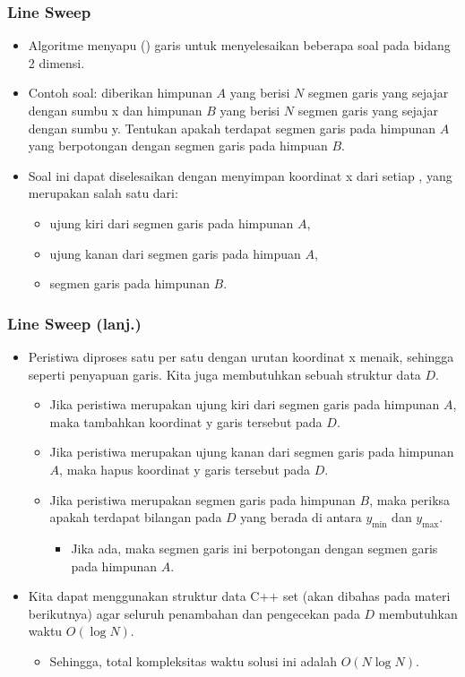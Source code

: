 \begin{frame}[fragile]
\frametitle{Line Sweep}
\begin{itemize}
  \item Algoritme  menyapu (\xspace) garis untuk menyelesaikan beberapa soal pada bidang 2 dimensi.
  \item Contoh soal: diberikan himpunan $A$ yang berisi $N$ segmen garis yang sejajar dengan sumbu x dan himpunan $B$ yang berisi $N$ segmen garis yang sejajar dengan sumbu y. Tentukan apakah terdapat segmen garis pada himpunan $A$ yang berpotongan dengan segmen garis pada himpuan $B$.
  \item Soal ini dapat diselesaikan dengan menyimpan koordinat x dari setiap , yang merupakan salah satu dari:
  \begin{itemize}
    \item ujung kiri dari segmen garis pada himpunan $A$,
    \item ujung kanan dari segmen garis pada himpuan $A$,
    \item segmen garis pada himpunan $B$.
  \end{itemize}
\end{itemize}
\end{frame}

\begin{frame}[fragile]
\frametitle{Line Sweep (lanj.)}
\begin{itemize}
  \item Peristiwa diproses satu per satu dengan urutan koordinat x menaik, sehingga seperti penyapuan garis. Kita juga membutuhkan sebuah struktur data $D$.
  \begin{itemize}
    \item Jika peristiwa merupakan ujung kiri dari segmen garis pada himpunan $A$, maka tambahkan koordinat y garis tersebut pada $D$.
    \item Jika peristiwa merupakan ujung kanan dari segmen garis pada himpunan $A$, maka hapus koordinat y garis tersebut pada $D$.
    \item Jika peristiwa merupakan segmen garis pada himpunan $B$, maka periksa apakah terdapat bilangan pada $D$ yang berada di antara $y_{\min}$ dan $y_{\max}$.
    \begin{itemize}
      \item Jika ada, maka segmen garis ini berpotongan dengan segmen garis pada himpunan $A$.
    \end{itemize}
  \end{itemize}
  \item Kita dapat menggunakan struktur data C++ set (akan dibahas pada materi berikutnya) agar seluruh penambahan dan pengecekan pada $D$ membutuhkan waktu $O(\log N)$.
  \begin{itemize}
    \item Sehingga, total kompleksitas waktu solusi ini adalah $O(N \log N)$.
  \end{itemize}
\end{itemize}
\end{frame}



